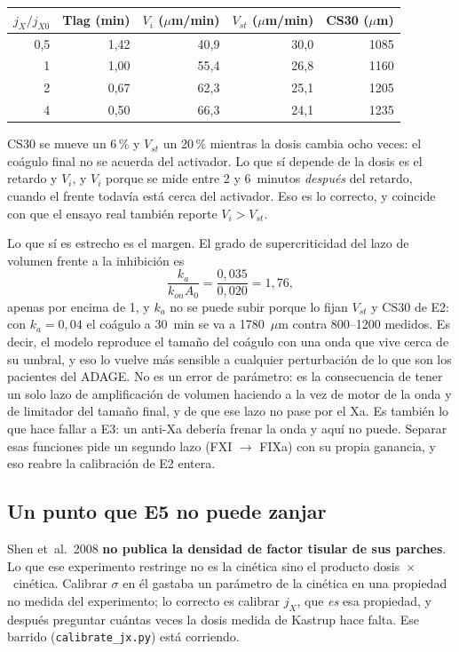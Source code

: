 \documentclass[11pt,a4paper]{article}
\begin{document}
\begin{center}
\small
\begin{tabular}{@{}rrrrr@{}}
\toprule
$j_X/j_{X0}$ & Tlag (min) & $V_i$ ($\mu$m/min) & $V_{st}$ ($\mu$m/min) & CS30 ($\mu$m) \\
\midrule
0{,}5 & 1{,}42 & 40{,}9 & 30{,}0 & 1085 \\
1     & 1{,}00 & 55{,}4 & 26{,}8 & 1160 \\
2     & 0{,}67 & 62{,}3 & 25{,}1 & 1205 \\
4     & 0{,}50 & 66{,}3 & 24{,}1 & 1235 \\
\bottomrule
\end{tabular}
\end{center}

\noindent
CS30 se mueve un 6\,\% y $V_{st}$ un 20\,\% mientras la dosis cambia ocho veces: el
coágulo final no se acuerda del activador. Lo que sí depende de la dosis es el
retardo y $V_i$, y $V_i$ porque se mide entre 2 y 6~minutos \emph{después} del
retardo, cuando el frente todavía está cerca del activador. Eso es lo correcto, y
coincide con que el ensayo real también reporte $V_i>V_{st}$.

Lo que sí es estrecho es el margen. El grado de supercriticidad del lazo de volumen
frente a la inhibición es
%
\begin{equation}
\frac{k_a}{k_{on}A_0}=\frac{0{,}035}{0{,}020}=1{,}76 ,
\end{equation}
%
apenas por encima de 1, y $k_a$ no se puede subir porque lo fijan $V_{st}$ y CS30 de
E2: con $k_a=0{,}04$ el coágulo a 30~min se va a 1780~$\mu$m contra 800--1200
medidos. Es decir, el modelo reproduce el tamaño del coágulo con una onda que vive
cerca de su umbral, y eso lo vuelve más sensible a cualquier perturbación de lo que
son los pacientes del ADAGE. No es un error de parámetro: es la consecuencia de
tener un solo lazo de amplificación de volumen haciendo a la vez de motor de la onda
y de limitador del tamaño final, y de que ese lazo no pase por el Xa. Es también lo
que hace fallar a E3: un anti-Xa debería frenar la onda y aquí no puede. Separar
esas funciones pide un segundo lazo (FXI $\to$ FIXa) con su propia ganancia, y eso
reabre la calibración de E2 entera.

\subsection{Un punto que E5 no puede zanjar}

Shen
et~al.~2008 \textbf{no publica la densidad de factor tisular de sus parches}. Lo que
ese experimento restringe no es la cinética sino el producto dosis~$\times$~cinética.
Calibrar $\sigma$ en él gastaba un parámetro de la cinética en una propiedad no
medida del experimento; lo correcto es calibrar $j_X$, que \emph{es} esa propiedad, y
después preguntar cuántas veces la dosis medida de Kastrup hace falta. Ese barrido
(\texttt{calibrate\_jx.py}) está corriendo.
\end{document}
